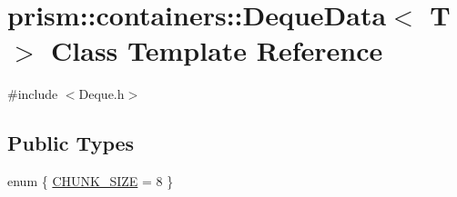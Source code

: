 \hypertarget{structprism_1_1containers_1_1_deque_data}{}\section{prism\+:\+:containers\+:\+:Deque\+Data$<$ T $>$ Class Template Reference}
\label{structprism_1_1containers_1_1_deque_data}


{\ttfamily \#include $<$Deque.\+h$>$}

\subsection*{Public Types}
\begin{DoxyCompactItemize}
\item 
enum \{ \hyperlink{structprism_1_1containers_1_1_deque_data_aed08082decb29717e0d968fabb1f1ea4a772861c6d49ff3131a0f2acd7e4b588b}{C\+H\+U\+N\+K\+\_\+\+S\+I\+ZE} = 8
 \}
\end{DoxyCompactItemize}
